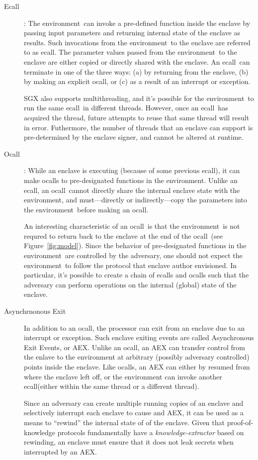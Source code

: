 \documentclass[11pt]{article}
\newcommand{\ecall}{\textsf{ecall}}
\newcommand{\ocall}{\textsf{ocall}}
\newcommand{\env}{\textsf{environment}}
\begin{document}
  \begin{description}
  \item[Ecall]: The \env\ can invoke a pre-defined function inside the
    enclave by passing input parameters and returning internal state
    of the enclave as results. Such invocations from the \env\ to the
    enclave are referred to as \ecall. The parameter values passed
    from the \env\ to the enclave are either copied or directly shared
    with the enclave. An \ecall\ can terminate in one of the three
    ways: (a) by returning from the enclave, (b) by making an explicit
    \ocall, or (c) as a result of an interrupt or exception.

    SGX also supports multithreading, and it's possible for the
    \env\ to run the same \ecall\ in different threads. However, once
    an \ecall\ has acquired the thread, future attempts to reuse that
    same thread will result in error. Futhermore, the number of
    threads that an enclave can support is pre-determined by the
    enclave signer, and cannot be altered at runtime.

  \item [Ocall]: While an enclave is executing (because of some
    previous \ecall), it can make \ocall s  to pre-designated
    functions in the \env.  Unlike an \ecall, an \ocall\ cannot
    directly share the internal enclave state with the \env, and
    must---directly or indirectly---copy the parameters into the
    \env\ before making an \ocall.

    An interesting characteristic of an \ocall\ is that the \env\ is
    not requred to return back to the enclave at the end of the
    \ocall\ (see Figure~\ref{fig:model}). Since the behavior of pre-designated
    functions in the \env\ are controlled by the adversary, one should
    not expect the \env\ to follow the protocol that enclave author
    envisioned. In particular, it's possible to create a chain of
    \ecall s and \ocall s such that the adversary can perform
    operations on the internal (global) state of the enclave.

  \item[Asynchrnonous Exit] In addition to an \ocall, the
    processor can exit from an enclave due to an interrupt or
    exception. Such enclave exiting events are called Asynchronous
    Exit Events, or AEX. Unlike an \ocall, an AEX can transfer control
    from the enlave to the environment at arbitrary (possibly adversary
    controlled) points inside the enclave. Like \ocall s, an AEX can
    either by resumed from where the enclave left off, or the
    environment can invoke another \ecall (either within the same
    thread or a different thread).

    Since an adversary can create multiple running copies of an
    enclave and selectively interrupt each enclave to cause and AEX,
    it can be used as a means to ``rewind'' the internal state of of
    the enclave. Given that proof-of-knowledge \cite{BellarePOK}
    protocols fundamentally have a \textit{knowledge-extractor} based
    on rewinding, an enclave must ensure that it does not leak secrets
    when interrupted by an AEX.

  \end{description}
\end{document}

